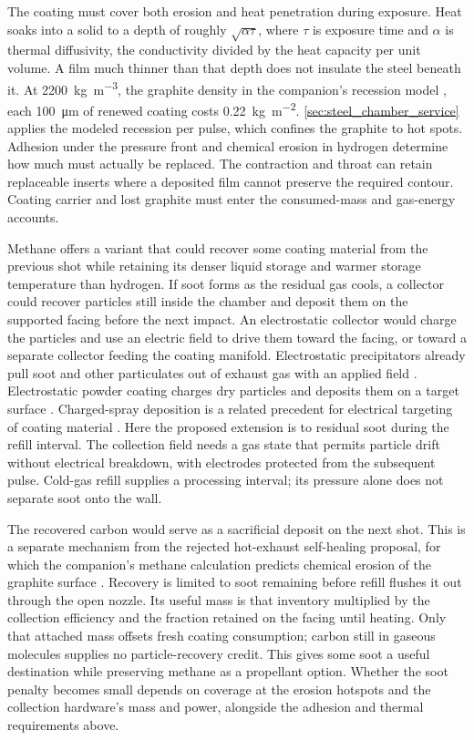 \documentclass{article}
\begin{document}
The coating must cover both erosion and heat penetration during exposure. Heat soaks into a solid to a depth of roughly $\sqrt{\alpha\tau}$, where $\tau$ is exposure time and $\alpha$ is thermal diffusivity, the conductivity divided by the heat capacity per unit volume. A film much thinner than that depth does not insulate the steel beneath it. At \SI{2200}{\kilogram\per\cubic\meter}, the graphite density in the companion's recession model \cite{Katz_puffsat_impact_sim_2026}, each \SI{100}{\micro\meter} of renewed coating costs \SI{0.22}{\kilogram\per\square\meter}. \autoref{sec:steel_chamber_service} applies the modeled recession per pulse, which confines the graphite to hot spots. Adhesion under the pressure front and chemical erosion in hydrogen determine how much must actually be replaced. The contraction and throat can retain replaceable inserts where a deposited film cannot preserve the required contour. Coating carrier and lost graphite must enter the consumed-mass and gas-energy accounts.

Methane offers a variant that could recover some coating material from the previous shot while retaining its denser liquid storage and warmer storage temperature than hydrogen. If soot forms as the residual gas cools, a collector could recover particles still inside the chamber and deposit them on the supported facing before the next impact. An electrostatic collector would charge the particles and use an electric field to drive them toward the facing, or toward a separate collector feeding the coating manifold. Electrostatic precipitators already pull soot and other particulates out of exhaust gas with an applied field \cite{jaworek2007_exhaust_esp}. Electrostatic powder coating charges dry particles and deposits them on a target surface \cite{bailey1998_powder_coating}. Charged-spray deposition is a related precedent for electrical targeting of coating material \cite{law2001_electrostatic_spray}. Here the proposed extension is to residual soot during the refill interval. The collection field needs a gas state that permits particle drift without electrical breakdown, with electrodes protected from the subsequent pulse. Cold-gas refill supplies a processing interval; its pressure alone does not separate soot onto the wall.

The recovered carbon would serve as a sacrificial deposit on the next shot. This is a separate mechanism from the rejected hot-exhaust self-healing proposal, for which the companion's methane calculation predicts chemical erosion of the graphite surface \cite{Katz_puffsat_impact_sim_2026}. Recovery is limited to soot remaining before refill flushes it out through the open nozzle. Its useful mass is that inventory multiplied by the collection efficiency and the fraction retained on the facing until heating. Only that attached mass offsets fresh coating consumption; carbon still in gaseous molecules supplies no particle-recovery credit. This gives some soot a useful destination while preserving methane as a propellant option. Whether the soot penalty becomes small depends on coverage at the erosion hotspots and the collection hardware's mass and power, alongside the adhesion and thermal requirements above.
\end{document}
